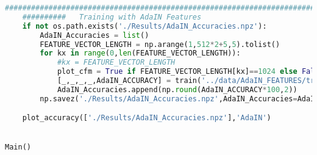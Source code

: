 \documentclass{article}
\begin{document}
\begin{lstlisting}[language=Python]
	###############################################################################################################
	##########	 Training with AdaIN Features
	if not os.path.exists('./Results/AdaIN_Accuracies.npz'):
		AdaIN_Accuracies = list()
		FEATURE_VECTOR_LENGTH = np.arange(1,512*2+5,5).tolist()
		for kx in range(0,len(FEATURE_VECTOR_LENGTH)):
			#kx = FEATURE_VECTOR_LENGTH
			plot_cfm = True if FEATURE_VECTOR_LENGTH[kx]==1024 else False
			[_,_,_,_,AdaIN_ACCURACY] = train('../data/AdaIN_FEATURES/training','../data/AdaIN_FEATURES/testing','AdaIN',classes,FEATURE_VECTOR_LENGTH[kx],verbose=1,plot_cfm=plot_cfm)
			AdaIN_Accuracies.append(np.round(AdaIN_ACCURACY*100,2))
		np.savez('./Results/AdaIN_Accuracies.npz',AdaIN_Accuracies=AdaIN_Accuracies,FEATURE_VECTOR_LENGTH=FEATURE_VECTOR_LENGTH)

	plot_accuracy(['./Results/AdaIN_Accuracies.npz'],'AdaIN')


Main()

\end{lstlisting}
\end{document}
